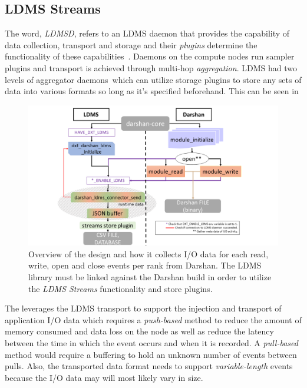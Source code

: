\documentclass[conference]{IEEEtran}
\begin{document}
\subsection{LDMS Streams}
The word, \emph{LDMSD}, refers to an LDMS daemon that provides the capability of data collection, transport and storage and their \emph{plugins} determine the functionality of these capabilities~\cite{ldmsgithubwiki}. Daemons on the compute nodes run sampler plugins and transport is achieved through multi-hop \emph{aggregation}. LDMS had two levels of aggregator daemons~\cite{ldmsgithubwiki}which can utilize storage plugins to store any sets of data into various formats so long as it's specified beforehand. This can be seen in 

\begin{figure}
  \centering
    \includegraphics[trim={3.5cm 0 0 0},clip,
    width=1.15\linewidth]{figs/darshan-connector.PNG}
\caption{Overview of the \connector design and how it collects I/O data for each read, write, open and close events per rank from Darshan. The LDMS library must be linked against the Darshan build in order to utilize the \emph{LDMS Streams} functionality and store plugins.}
\label{f:Darshan Connector}
\end{figure}

The \Darshan leverages the LDMS transport to support the injection and transport of application I/O data which requires a \emph{push-based} method to reduce the amount of memory consumed and data loss on the node as well as reduce the latency between the time in which the event occurs and when it is recorded. A \emph{pull-based} method would require a buffering to hold an unknown number of events between pulls. Also, the transported data format needs to support  \emph{variable-length} events because the I/O data may will most likely vary in size. 
\end{document}
